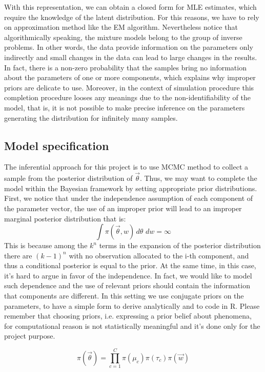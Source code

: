 \documentclass{article}
\begin{document}
With this representation, we can obtain a closed form for MLE estimates, which require the knowledge of the latent distribution. For this reasons, we have to rely on approximation method like the EM algorithm. Nevertheless notice that algorithmically speaking, the mixture models belong to the group of inverse problems. In other words, the data provide information on the parameters only indirectly and small changes in the data can lead to large changes in the results. In fact, there is a non-zero probability that the samples bring no information about the parameters of one or more components, which explains why improper priors are delicate to use. Moreover, in the context of simulation procedure this completion procedure looses any meanings due to the non-identifiability of the model, that is, it is not possible to make precise inference on the parameters generating the distribution for infinitely many samples.

\subsection{Model specification}
The inferential approach for this project is to use MCMC method to collect a sample from the posterior distribution of $\vec \theta$. Thus, we may want to complete the model within the Bayesian framework by setting appropriate prior distributions. First, we notice that under the independence assumption of each component of the parameter vector, the use of an improper prior will lead to an improper marginal posterior distribution that is:
\begin{equation}
\int \pi(\vec \theta, w) \,d \theta \, \,dw = \infty
\end{equation}
This is because among the $k^n$ terms in the expansion of the posterior distribution there are $(k-1)^n$ with no observation allocated to the i-th component, and thus a conditional posterior is equal to the prior. At the same time, in this case, it's hard to argue in favor of the independence. In fact, we would like to model such dependence and the use of relevant priors should contain the information that components are different. In this setting we use conjugate priors on the parameters, to have a simple form to derive analytically and to code in R. Please remember that choosing priors, i.e. expressing a prior belief about phenomena, for computational reason is not statistically meaningful and it's done only for the project purpose. 

\begin{equation}
\pi(\vec \theta) = \prod_{c=1}^C \pi(\mu_c) \pi(\tau_c) \pi(\vec w)  
\end{equation}
\end{document}

